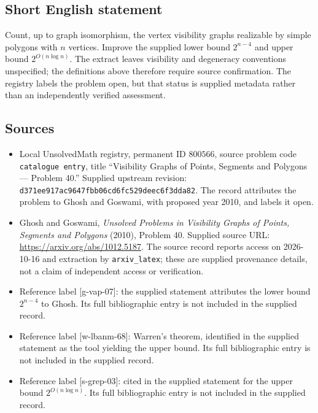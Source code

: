 \documentclass[11pt]{article}
\begin{document}
\subsection{Short English statement}
Count, up to graph isomorphism, the vertex visibility graphs realizable by simple polygons with \(n\) vertices. Improve the supplied lower bound \(2^{n-4}\) and upper bound \(2^{O(n\log n)}\). The extract leaves visibility and degeneracy conventions unspecified; the definitions above therefore require source confirmation. The registry labels the problem open, but that status is supplied metadata rather than an independently verified assessment.
\subsection{Sources}
\begin{itemize}
\item Local UnsolvedMath registry, permanent ID \(800566\), source problem code \texttt{catalogue entry}, title ``Visibility Graphs of Points, Segments and Polygons --- Problem 40.'' Supplied upstream revision: \texttt{d371ee917ac9647fbb06cd6fc529deec6f3dda82}. The record attributes the problem to Ghosh and Goswami, with proposed year 2010, and labels it open.
\item Ghosh and Goswami, \emph{Unsolved Problems in Visibility Graphs of Points, Segments and Polygons} (2010), Problem 40. Supplied source URL: \url{https://arxiv.org/abs/1012.5187}. The source record reports access on 2026-10-16 and extraction by \texttt{arxiv\_latex}; these are supplied provenance details, not a claim of independent access or verification.
\item Reference label [g-vap-07]: the supplied statement attributes the lower bound \(2^{n-4}\) to Ghosh. Its full bibliographic entry is not included in the supplied record.
\item Reference label [w-lbanm-68]: Warren's theorem, identified in the supplied statement as the tool yielding the upper bound. Its full bibliographic entry is not included in the supplied record.
\item Reference label [s-grep-03]: cited in the supplied statement for the upper bound \(2^{O(n\log n)}\). Its full bibliographic entry is not included in the supplied record.
\end{itemize}
\end{document}
